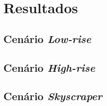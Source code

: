 \chapter{\label{chap:results}Resultados}

\section{Cenário \textit{Low-rise}}

\section{Cenário \textit{High-rise}}

\section{Cenário \textit{Skyscraper}}